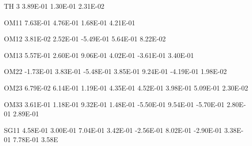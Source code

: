 \documentclass[
  11pt,
  krantz2,
  a4paper]{krantz}
\newenvironment{Shaded}{\begin{snugshade}}{\end{snugshade}}
\newcommand{\DecValTok}[1]{\textcolor[rgb]{0.00,0.00,0.81}{#1}}
\newcommand{\FloatTok}[1]{\textcolor[rgb]{0.00,0.00,0.81}{#1}}
\newcommand{\NormalTok}[1]{#1}
\theoremstyle{definition}
\theoremstyle{definition}
\theoremstyle{definition}
\theoremstyle{remark}
\begin{document}
\begin{Shaded}
\begin{Highlighting}[]
\NormalTok{TH }\DecValTok{3}    \FloatTok{3.89E{-}01}  \FloatTok{1.30E{-}01}  \FloatTok{2.31E{-}02}                                                                   
                                                                                                       
\NormalTok{OM11    }\FloatTok{7.63E{-}01}  \FloatTok{4.76E{-}01}  \FloatTok{1.68E{-}01}  \FloatTok{4.21E{-}01}                                                         
                                                                                                       
\NormalTok{OM12    }\FloatTok{3.81E{-}02}  \FloatTok{2.52E{-}01} \FloatTok{{-}5.49E{-}01}  \FloatTok{5.64E{-}01}  \FloatTok{8.22E{-}02}                                               
                                                                                                       
\NormalTok{OM13    }\FloatTok{5.57E{-}01}  \FloatTok{2.60E{-}01}  \FloatTok{9.06E{-}01}  \FloatTok{4.02E{-}01} \FloatTok{{-}3.61E{-}01}  \FloatTok{3.40E{-}01}                                     
                                                                                                       
\NormalTok{OM22   }\FloatTok{{-}1.73E{-}01}  \FloatTok{3.83E{-}01} \FloatTok{{-}5.48E{-}01}  \FloatTok{3.85E{-}01}  \FloatTok{9.24E{-}01} \FloatTok{{-}4.19E{-}01}  \FloatTok{1.98E{-}02}                           
                                                                                                       
\NormalTok{OM23    }\FloatTok{6.79E{-}02}  \FloatTok{6.14E{-}01}  \FloatTok{1.19E{-}01}  \FloatTok{4.35E{-}01}  \FloatTok{4.52E{-}01}  \FloatTok{3.98E{-}01}  \FloatTok{5.09E{-}01}  \FloatTok{2.30E{-}02}                 
                                                                                                       
\NormalTok{OM33    }\FloatTok{3.61E{-}01}  \FloatTok{1.18E{-}01}  \FloatTok{9.32E{-}01}  \FloatTok{1.48E{-}01} \FloatTok{{-}5.50E{-}01}  \FloatTok{9.54E{-}01} \FloatTok{{-}5.70E{-}01}  \FloatTok{2.80E{-}01}  \FloatTok{2.89E{-}01}       
                                                                                                       
\NormalTok{SG11    }\FloatTok{4.58E{-}01}  \FloatTok{3.00E{-}01}  \FloatTok{7.04E{-}01}  \FloatTok{3.42E{-}01} \FloatTok{{-}2.56E{-}01}  \FloatTok{8.02E{-}01} \FloatTok{{-}2.90E{-}01}  \FloatTok{3.38E{-}01}  \FloatTok{7.78E{-}01}  \FloatTok{3.58}\NormalTok{E}
                                                                                                       

\end{Highlighting}
\end{Shaded}
\end{document}

